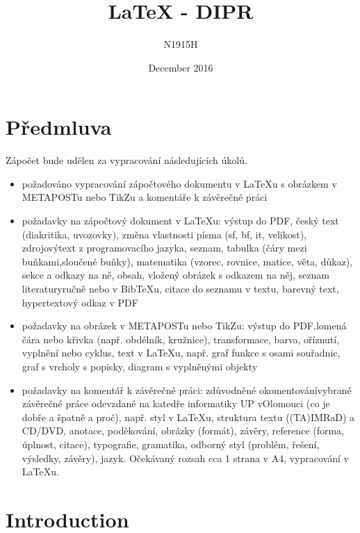 \documentclass[12pt,a4paper]{article}
\title{\LaTeX{} - DIPR}
\date{December 2016}
\author{N1915H}
\begin{document}
	\maketitle
	\newpage
	\section*{Předmluva}
	Zápočet bude udělen za vypracování následujících úkolů.
\begin{itemize} \itemsep-2pt \rightskip-5pt
	\item požadováno vypracování zápočtového dokumentu v LaTeXu s obrázkem v METAPOSTu nebo TikZu a komentáře k závěrečné práci
	\item požadavky na zápočtový dokument v LaTeXu: výstup do PDF, český text (diakritika, uvozovky), změna vlastnosti písma (sf, bf, it, velikost), zdrojový\linebreak text z programovacího jazyka, seznam, tabulka (čáry mezi buňkami,\linebreak sloučené buňky), matematika (vzorec, rovnice, matice, věta, důkaz), sekce a odkazy na ně, obsah, vložený obrázek s odkazem na něj, seznam literatury\linebreak ručně nebo v BibTeXu, citace do seznamu v textu, barevný text, hypertextový odkaz v PDF
	\item požadavky na obrázek v METAPOSTu nebo TikZu: výstup do PDF,\linebreak lomená čára nebo křivka (např. obdélník, kružnice), transformace, barva, oříznutí, vyplnění nebo cyklus, text v LaTeXu, např. graf funkce s osami souřadnic, graf s vrcholy s popisky, diagram s vyplněnými objekty
	\item požadavky na komentář k závěrečné práci: zdůvodněné okomentování\linebreak vybrané závěrečné práce odevzdané na katedře informatiky UP v\linebreak Olomouci (co je dobře a špatně a proč), např. styl v LaTeXu, struktura textu ((TA)IMRaD) a CD/DVD, anotace, poděkování, obrázky (formát), závěry, reference (forma, úplnost, citace), typografie, gramatika, odborný styl (problém, řešení, výsledky, závěry), jazyk. Očekávaný rozsah cca 1 strana v A4, vypracování v LaTeXu.
\end{itemize}
	\newpage
	\tableofcontents
	\setcounter{page}{3}
	\newpage
\section{Introduction}{\setcounter{section}{1}}
\end{document}

